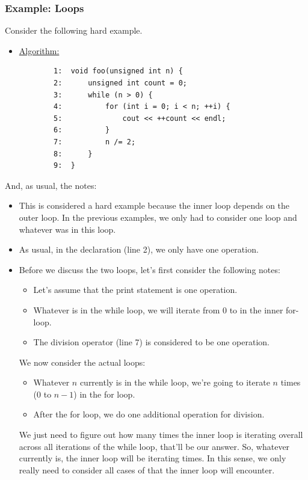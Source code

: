 \documentclass[letterpaper]{article}
\begin{document}
\subsubsection{Example: Loops}
Consider the following hard example. 
\begin{itemize}
    \item \underline{Algorithm:}
    \begin{verbatim}
        1:  void foo(unsigned int n) {
        2:      unsigned int count = 0;
        3:      while (n > 0) {
        4:          for (int i = 0; i < n; ++i) {
        5:              cout << ++count << endl; 
        6:          }
        7:          n /= 2;
        8:      }
        9:  }
    \end{verbatim}
\end{itemize}
And, as usual, the notes: 
\begin{itemize}
    \item This is considered a hard example because the inner loop depends on the outer loop. In the previous examples, we only had to consider one loop and whatever was in this loop. 
    \item As usual, in the  declaration (line 2), we only have one operation. 
    \item Before we discuss the two loops, let's first consider the following notes:  
    \begin{itemize}
        \item Let's assume that the print statement is one operation.
        \item Whatever  is in the while loop, we will iterate from 0 to  in the inner for-loop. 
        \item The division operator (line 7) is considered to be one operation.
    \end{itemize}
    We now consider the actual loops: 
    \begin{itemize}
        \item Whatever $n$ currently is in the while loop, we're going to iterate $n$ times (0 to $n - 1$) in the for loop.
        \item After the for loop, we do one additional operation for division. 
    \end{itemize}
    We just need to figure out how many times the inner loop is iterating overall across all iterations of the while loop, that'll be our answer. So, whatever  currently is, the inner loop will be iterating  times. In this sense, we only really need to consider all cases of  that the inner loop will encounter. 


\end{itemize}
\end{document}
